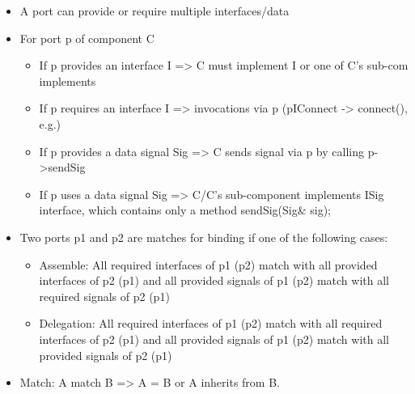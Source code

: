 \begin{minipage}{0.95\columnwidth}

\end{minipage}

\begin{minipage}{0.95\columnwidth}

\end{minipage}

\begin{minipage}{0.95\columnwidth}

\end{minipage}


\begin{itemize}
	\item A port can provide or require multiple interfaces/data
	
	\item For port p of component C
	
	\begin{itemize}
		\item If p provides an interface I => C must implement I or one of C's sub-com implements
		\item If p requires an interface I => invocations via p (pIConnect -> connect(), e.g.)
		\item If p provides a data signal Sig => C sends signal via p by calling p->sendSig
		\item If p uses a data signal Sig => C/C's sub-component implements ISig interface, which contains only a method sendSig(Sig\& sig);
	\end{itemize}
	
	\item Two ports p1 and p2 are matches for binding if one of the following cases:
	\begin{itemize}
		\item Assemble: All required interfaces of p1 (p2) match with all provided interfaces of p2 (p1) and all provided signals of p1 (p2) match with all required signals of p2 (p1)
		
		\item Delegation: All required interfaces of p1 (p2) match with all required interfaces of p2 (p1) and all provided signals of p1 (p2) match with all provided signals of p2 (p1)
	\end{itemize}
	
	\item Match: A match B => A = B or A inherits from B.
	
\end{itemize}

